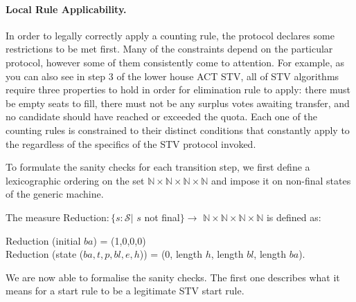 \documentclass{llncs}
\begin{document}
\paragraph{Local Rule Applicability.} In order to legally correctly apply a counting rule, the protocol declares some restrictions to be met first. Many of the constraints depend on the particular protocol, however some of them consistently come to attention. For example, as you can also see in step 3 of the lower house ACT STV, all of STV algorithms require three properties to hold in order for elimination rule to apply: there must be empty seats to fill, there must not be any surplus votes awaiting transfer, and no candidate should have reached or exceeded the quota. Each one of the counting rules is constrained to their distinct conditions that constantly apply to the regardless of the specifics of the STV protocol invoked.



To formulate the sanity checks for each transition step, we first  define a lexicographic ordering on the set $\mathbb{N}\times\mathbb{N}\times\mathbb{N}\times\mathbb{N}$ and impose it on non-final states of the generic machine.   
\begin{definition}
The measure \textsf{Reduction}$: \{s: \mathcal{S} |$ $s$ not final$\}\longrightarrow$ $\mathbb{N}\times\mathbb{N}\times\mathbb{N}\times\mathbb{N}$ 
is defined as:
\begin{center}
\textsf{Reduction} (\textsf{initial} $ba$) = (1,0,0,0)\\
\textsf{Reduction} (\textsf{state} ($ba,t,p,bl,e,h$)) = (0, \textsf{length} $h$, \textsf{length} $bl$, \textsf{length}  $ba$).
\end{center}
\end{definition}
We are now able to formalise the sanity checks. The first one describes what it means for a start rule to be a legitimate STV start rule. 




\end{document}
